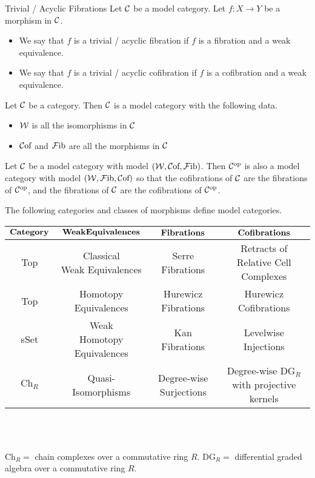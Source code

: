 \documentclass[a4paper]{article}
\begin{document}
\begin{defn}{Trivial / Acyclic Fibrations}{} Let $\mathcal{C}$ be a model category. Let $f:X\to Y$ be a morphism in $\mathcal{C}$. 
\begin{itemize}
\item We say that $f$ is a trivial / acyclic fibration if $f$ is a fibration and a weak equivalence. 
\item We say that $f$ is a trivial / acyclic cofibration if $f$ is a cofibration and a weak equivalence. 
\end{itemize}
\end{defn}

\begin{lmm}{}{} Let $\mathcal{C}$ be a category. Then $\mathcal{C}$ is a model category with the following data. 
\begin{itemize}
\item $\mathcal{W}$ is all the isomorphisms in $\mathcal{C}$
\item $\mathcal{C}\text{of}$ and $\mathcal{F}\text{ib}$ are all the morphisms in $\mathcal{C}$
\end{itemize}
\end{lmm}

\begin{prp}{}{} Let $\mathcal{C}$ be a model category with model $(\mathcal{W},\mathcal{C}\text{of},\mathcal{F}\text{ib})$. Then $\mathcal{C}^\text{op}$ is also a model category with model $(\mathcal{W}, \mathcal{F}\text{ib},\mathcal{C}\text{of})$ so that the cofibrations of $\mathcal{C}$ are the fibrations of $\mathcal{C}^\text{op}$, and the fibrations of $\mathcal{C}$ are the cofibrations of $\mathcal{C}^\text{op}$. 
\end{prp}

\begin{thm}{}{} The following categories and classes of morphisms define model categories. 
\begin{center}
\begin{tabular}{ |c|c|c|c| } 
\hline
$\bold{Category}$ & $\bold{Weak Equivalences}$ & $\bold{Fibrations}$ & $\bold{Cofibrations}$ \\
\hline
Top & \thead{Classical \\ Weak Equivalences} & Serre Fibrations & \thead{Retracts of \\ Relative Cell Complexes}\\
\hline
Top & Homotopy Equivalences & Hurewicz Fibrations & Hurewicz Cofibrations \\
\hline
sSet & \thead{Weak \\ Homotopy Equivalences} & Kan Fibrations & Levelwise Injections \\
\hline
$\text{Ch}_R$ & Quasi-Isomorphisms & Degree-wise Surjections & \thead{Degree-wise $\text{DG}_R$ \\ with projective kernels}\\
\hline
\end{tabular}
\end{center}~\\~\\
\end{thm}
$\text{Ch}_R=$ chain complexes over a commutative ring $R$. $\text{DG}_R=$ differential graded algebra over a commutative ring $R$. 
\end{document}
